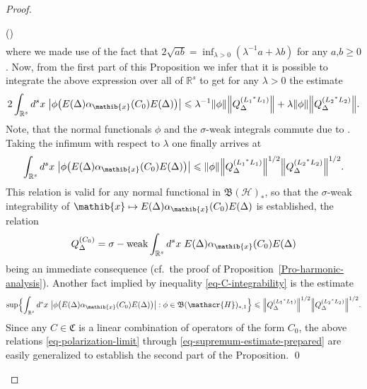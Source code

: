 \documentclass[11pt,twoside,openright]{report}
\theoremstyle{definition}
\theoremstyle{plain}
\theoremstyle{remark}
\theoremstyle{assumption}
\DeclareMathOperator{\sw}{\sigma-weak}
\newcommand{\Bset}[1]{\Bigl\{ #1 \Bigr\}}
\newcommand{\babs}[1]{\bigl\lvert #1 \bigr\rvert}
\newcommand{\norm}[1]{\lVert #1 \rVert}
\newcommand{\Bnorm}[1]{\Bigl\lVert #1 \Bigr\rVert}
\newcommand{\Cfrak}{\mathfrak{C}}
\newcommand{\xib}{\mathib{x}}
\newcommand{\Rs}{\mathbb{R}^s}
\newcommand{\BH}{\mathfrak{B} ( \mathscr{H} )}
\newcommand{\ED}{E ( \Delta )}
\newcommand{\aibx}{\alpha_\mathib{x}}
\newcounter{proofitem}
\newenvironment{prooflist}{\begin{list}{(\roman{proofitem})}%
  {\usecounter{proofitem} \setlength{\topsep}{0ex}%
   \setlength{\parsep}{0.2ex} \setlength{\itemsep}{0.4ex}%
   \setlength{\leftmargin}{0em} \setlength{\itemindent}{0.5em}%
   \setlength{\listparindent}{1em}}}{\qed \end{list}}
\begin{document}
\begin{proof}
\begin{prooflist}
\begin{multline*}
    \end{multline*}
    where we made use of the fact that $2 \sqrt{a b} = \inf_{\lambda >
    0} ( \lambda^{-1} a + \lambda b )$ for any $a \text{,} b \geqslant
    0$. Now, from the first part of this Proposition we infer that it
    is possible to integrate the above expression over all of $\Rs$
    to get for any $\lambda > 0$ the estimate
    \begin{equation*}
      2 \int_{\Rs} d^s x \; \babs{\phi \bigl(\ED \aibx ( C_0 ) \ED
      \bigr)} \leqslant \lambda^{-1} \norm{\phi}
      \Bnorm{Q_\Delta^{({L_1}^* L_1 )}} + \lambda \norm{\phi}
      \Bnorm{Q_\Delta^{( {L_2}^* L_2 )}} \text{.} 
    \end{equation*}
    Note, that the normal functionals $\phi$ and the $\sigma$-weak
    integrals commute due to \cite[Proposition~II.5.7 adapted to
    integrals in locally convex spaces]{fell/doran:1988a}. Taking the
    infimum with respect to $\lambda$ one finally arrives at 
    \begin{equation}
      \label{eq-C-integrability}
      \int_{\Rs} d^s x \; \babs{\phi \bigl( \ED \aibx ( C_0 ) \ED
      \bigr)} \leqslant \norm{\phi} \Bnorm{Q_\Delta^{( {L_1}^* L_1
        )}}^{1/2} \Bnorm{Q_\Delta^{( {L_2}^* L_2 )}}^{1/2} \text{.} 
    \end{equation}
    This relation is valid for any normal functional in $\BH_*$, so
    that the $\sigma$-weak integrability of $\xib \mapsto \ED \aibx (
    C_0 ) \ED$ is established, the relation
    \begin{equation}
      \label{eq-C-limit}
      Q_\Delta^{( C_0 )} = \sw \int_{\Rs} d^s x \; \ED \aibx ( C_0 )
      \ED 
    \end{equation}
    being an immediate consequence (cf.~the proof of
    Proposition~\ref{Pro-harmonic-analysis}). Another fact implied by
    inequality \eqref{eq-C-integrability} is the estimate
    \begin{equation}
      \label{eq-supremum-estimate-prepared}
      \sup \Bset{\int_{\Rs} d^s x \; \babs{\phi \bigl( \ED \aibx ( C_0
      ) \ED \bigr)} : \phi \in \BH_{*,1}} 
      \leqslant \Bnorm{Q_\Delta^{( {L_1}^* L_1 )}}^{1/2}
      \Bnorm{Q_\Delta^{( {L_2}^* L_2 )}}^{1/2} \text{.}
    \end{equation}
    Since any $C \in \Cfrak$ is a linear combination of operators of
    the form $C_0$, the above relations \eqref{eq-polarization-limit}
    through \eqref{eq-supremum-estimate-prepared} are easily
    generalized to establish the second part of the Proposition.
  \end{prooflist}
  \renewcommand{\qed}{}
\end{proof}
\end{document}
